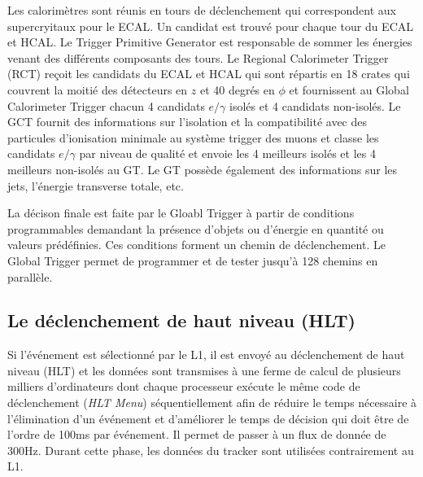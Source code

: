 Les calorimètres sont réunis en tours de déclenchement qui correspondent aux supercryitaux pour le ECAL. Un candidat est trouvé pour chaque tour du ECAL et HCAL. Le Trigger Primitive Generator est responsable de sommer les énergies venant des différents composants des tours.  Le Regional Calorimeter Trigger (RCT) reçoit les candidats du ECAL et HCAL qui sont répartis en 18 crates qui couvrent la moitié des détecteurs en $z$ et 40 degrés en $\phi$ et fournissent au Global Calorimeter Trigger chacun 4 candidats $e/\gamma$ isolés et 4 candidats non-isolés. Le GCT fournit des informations sur l'isolation et la compatibilité avec des particules d'ionisation minimale au système trigger des muons et classe les candidats $e/\gamma$ par niveau de qualité et envoie les 4 meilleurs isolés et les 4 meilleurs non-isolés au GT. Le GT possède également des informations sur les jets, l'énergie transverse totale, etc.

La décison finale est faite par le Gloabl Trigger à partir de conditions programmables demandant la présence d'objets ou d'énergie en quantité ou valeurs prédéfinies. Ces conditions forment un chemin de déclenchement. Le Global Trigger permet de programmer et de tester jusqu'à 128 chemins en parallèle. 

\subsection{Le déclenchement de haut niveau (HLT)}
Si l'événement est sélectionné par le L1, il est envoyé au déclenchement de haut niveau (HLT) et les données sont transmises à une ferme de calcul de plusieurs milliers d'ordinateurs  dont chaque processeur exécute le même code de déclenchement (\textit{HLT Menu}) séquentiellement afin de réduire le temps nécessaire à l'élimination d'un événement et d'améliorer le temps de décision qui doit être de l'ordre de 100ms par événement. Il permet de passer à un flux de donnée de 300Hz. Durant cette phase, les données du tracker sont utilisées contrairement au L1.

